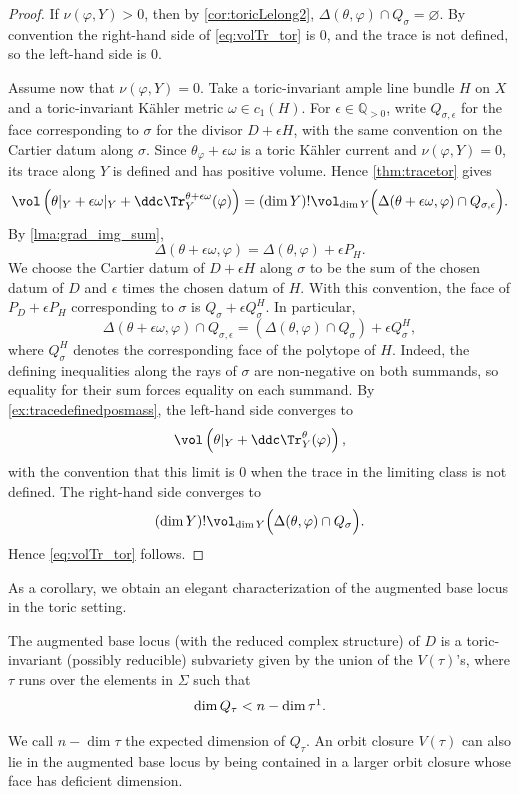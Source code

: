 \begin{proof}
    If $\nu(\varphi,Y)>0$, then by \cref{cor:toricLelong2}, $\Delta(\theta,\varphi)\cap Q_\sigma=\varnothing$. By convention the right-hand side of \eqref{eq:volTr_tor} is $0$, and the trace is not defined, so the left-hand side is $0$.

    Assume now that $\nu(\varphi,Y)=0$.
    Take a toric-invariant ample line bundle $H$ on $X$ and a toric-invariant Kähler metric $\omega\in c_1(H)$. For $\epsilon\in \mathbb{Q}_{>0}$, write $Q_{\sigma,\epsilon}$ for the face corresponding to $\sigma$ for the divisor $D+\epsilon H$, with the same convention on the Cartier datum along $\sigma$. Since $\theta_{\varphi}+\epsilon\omega$ is a toric Kähler current and $\nu(\varphi,Y)=0$, its trace along $Y$ is defined and has positive volume. Hence \cref{thm:tracetor} gives
    \[
    \vol \left(\theta|_Y+\epsilon\omega|_Y+\ddc \Tr_Y^{\theta+\epsilon\omega}(\varphi)\right)= (\dim Y)!\vol_{\dim Y} \Bigl(\Delta(\theta+\epsilon\omega,\varphi)\cap Q_{\sigma,\epsilon}\Bigr).
    \]
    By \cref{lma:grad_img_sum},
    \[
        \Delta(\theta+\epsilon\omega,\varphi)=\Delta(\theta,\varphi)+\epsilon P_H.
    \]
    We choose the Cartier datum of $D+\epsilon H$ along $\sigma$ to be the sum of the chosen datum of $D$ and $\epsilon$ times the chosen datum of $H$. With this convention, the face of $P_D+\epsilon P_H$ corresponding to $\sigma$ is $Q_\sigma+\epsilon Q_\sigma^H$. In particular,
    \[
        \Delta(\theta+\epsilon\omega,\varphi)\cap Q_{\sigma,\epsilon}=(\Delta(\theta,\varphi)\cap Q_{\sigma})+\epsilon Q^H_{\sigma},
    \]
    where $Q^H_{\sigma}$ denotes the corresponding face of the polytope of $H$. Indeed, the defining inequalities along the rays of $\sigma$ are non-negative on both summands, so equality for their sum forces equality on each summand. By \cref{ex:tracedefinedposmass}, the left-hand side converges to
    \[
        \vol\left(\theta|_Y+\ddc\Tr_Y^\theta(\varphi)\right),
    \]
    with the convention that this limit is $0$ when the trace in the limiting class is not defined. The right-hand side converges to
    \[
        (\dim Y)!\vol_{\dim Y}\Bigl(\Delta(\theta,\varphi)\cap Q_\sigma\Bigr).
    \]
    Hence \eqref{eq:volTr_tor} follows.
\end{proof}

As a corollary, we obtain an elegant characterization of the augmented base locus in the toric setting.
\begin{corollary}\label{cor:augbl}
    The augmented base locus (with the reduced complex structure) of $D$ is a toric-invariant (possibly reducible) subvariety given by the union of the $V(\tau)$'s, where $\tau$ runs over the elements in $\Sigma$ such that
    \[
    \dim Q_{\tau}<n-\dim \tau\footnotemark.
    \]
\end{corollary}
We call $n-\dim\tau$ the expected dimension of $Q_\tau$. An orbit closure $V(\tau)$ can also lie in the augmented base locus by being contained in a larger orbit closure whose face has deficient dimension.

